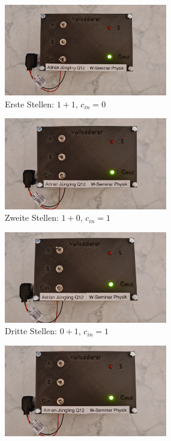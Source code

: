 \newpage
\begin{figure}[h!]
	\centering
	\begin{minipage}{.5\textwidth}
		\centering
		\includegraphics[height=4cm, keepaspectratio]{./Fotos/FA-0.jpg}\\
		Erste Stellen: $1 + 1$, $c_{in}=0$
		\vspace{.5cm}
	\end{minipage}%
	\begin{minipage}{.5\textwidth}
		\centering
		\includegraphics[height=4cm, keepaspectratio]{./Fotos/FA-1.jpg}\\
		Zweite Stellen: $1 + 0$, $c_{in}=1$
		\vspace{.5cm}
	\end{minipage}
	\begin{minipage}{.5\textwidth}
		\centering
		\includegraphics[height=4cm, keepaspectratio]{./Fotos/FA-2.jpg}\\
		Dritte Stellen: $0 + 1$, $c_{in}=1$
		\vspace{.5cm}
	\end{minipage}%
	\begin{minipage}{.5\textwidth}
		\centering
		\includegraphics[height=4cm, keepaspectratio]{./Fotos/FA-3.jpg}\\

\end{minipage}
\end{figure}
